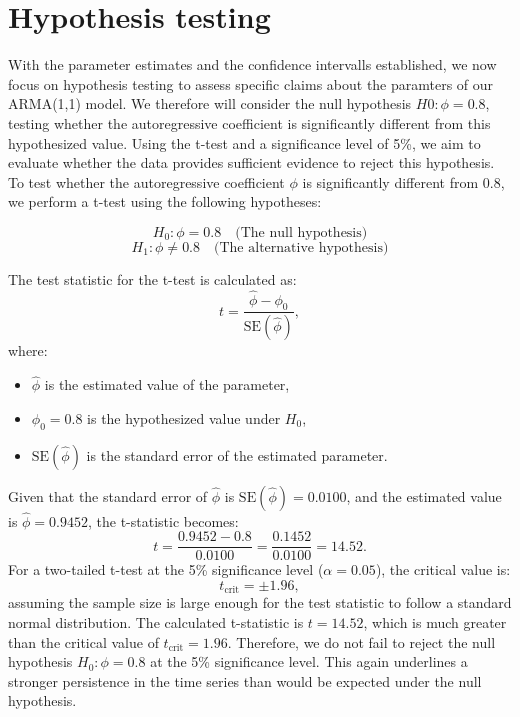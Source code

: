 \documentclass[a4paper,12pt]{article}
\begin{document}
\section{Hypothesis testing}
With the parameter estimates and the confidence intervalls established, we now focus on hypothesis testing to assess specific claims about the paramters of our ARMA(1,1) model. 
We therefore will consider the null hypothesis $H0: \phi =0.8$, testing whether the autoregressive coefficient is significantly different from this hypothesized value.  Using the t-test and a significance level of 5\%, we aim to evaluate whether the data provides sufficient evidence to reject this hypothesis.
To test whether the autoregressive coefficient \(\phi\) is significantly different from 0.8, we perform a t-test using the following hypotheses:

\[
H_0: \phi = 0.8 \quad \text{(The null hypothesis)}
\]
\[
H_1: \phi \neq 0.8 \quad \text{(The alternative hypothesis)}
\]

The test statistic for the t-test is calculated as:
\[
t = \frac{\hat{\phi} - \phi_0}{\text{SE}(\hat{\phi})},
\]
where:
\begin{itemize}
    \item \( \hat{\phi} \) is the estimated value of the parameter,
    \item \( \phi_0 = 0.8 \) is the hypothesized value under \( H_0 \),
    \item \( \text{SE}(\hat{\phi}) \) is the standard error of the estimated parameter.
\end{itemize}

Given that the standard error of \( \hat{\phi} \) is \( \text{SE}(\hat{\phi}) = 0.0100 \), and the estimated value is \( \hat{\phi} = 0.9452 \), the t-statistic becomes:
\[
t = \frac{0.9452 - 0.8}{0.0100} = \frac{0.1452}{0.0100} = 14.52.
\]
For a two-tailed t-test at the 5\% significance level (\(\alpha = 0.05\)), the critical value is:
\[
t_{\text{crit}} = \pm 1.96,
\]
assuming the sample size is large enough for the test statistic to follow a standard normal distribution.
The calculated t-statistic is \( t = 14.52 \), which is much greater than the critical value of \( t_{\text{crit}} = 1.96 \). Therefore, we do not fail to reject the null hypothesis \( H_0: \phi = 0.8 \) at the 5\% significance level.
This again underlines a stronger persistence in the time series than would be expected under the null hypothesis.
\end{document}

